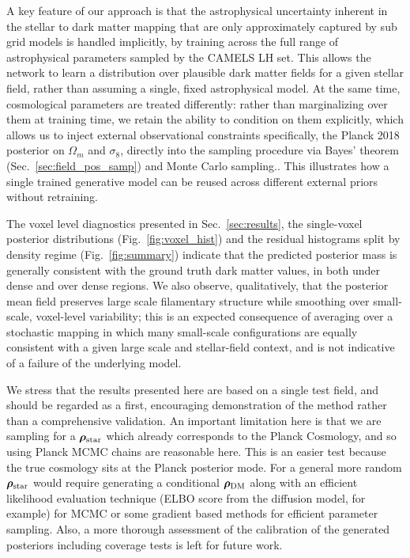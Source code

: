 A key feature of our approach is that the astrophysical uncertainty inherent in the stellar to dark matter mapping that are only approximately captured by sub grid models is handled implicitly, by training across the full range of astrophysical parameters sampled by the CAMELS LH set. This allows the network to learn a distribution over plausible dark matter fields for a given stellar field, rather than assuming a single, fixed astrophysical model. At the same time, cosmological parameters are treated differently: rather than marginalizing over them at training time, we retain the ability to condition on them explicitly, which allows us to inject external observational constraints specifically, the Planck 2018 posterior on $\Omega_m$ and $\sigma_8$, directly into the sampling procedure via Bayes' theorem (Sec.~\ref{sec:field_pos_samp}) and Monte Carlo sampling..
This illustrates how a single trained generative model can be reused across different external priors without retraining.

The voxel level diagnostics presented in Sec.~\ref{sec:results}, the single-voxel posterior distributions (Fig.~\ref{fig:voxel_hist}) and the residual histograms split by density regime (Fig.~\ref{fig:summary}) indicate that the predicted posterior mass is generally consistent with the ground truth dark matter values, in both under dense and over dense regions. We also observe, qualitatively, that the posterior mean field preserves large scale filamentary structure while smoothing over small-scale, voxel-level variability; this is an expected consequence of averaging over a stochastic mapping in which many small-scale configurations are equally consistent with a given large scale and stellar-field context, and is not indicative of a failure of the underlying model.

We stress that the results presented here are based on a single test field, and should be regarded as a first, encouraging demonstration of the method rather than a comprehensive validation. An important limitation here is that we are sampling for a $\bm{\rho}_\text{star}$ which already corresponds to the Planck Cosmology, and so using Planck MCMC chains are reasonable here. This is an easier test because the true cosmology sits at the Planck posterior mode. For a general more random $\bm{\rho}_\text{star}$ would require generating a conditional $\boldsymbol{\rho}_\mathrm{DM}$ along with an efficient likelihood evaluation technique (ELBO score from the diffusion model, for example) for MCMC or some gradient based methods for efficient parameter sampling. Also, a more thorough assessment of the calibration of the generated posteriors including coverage tests is left for future work.
